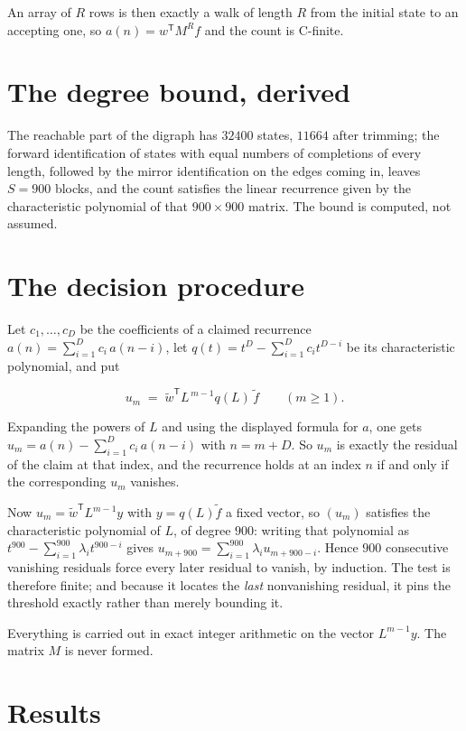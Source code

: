 \documentclass[11pt]{article}
\theoremstyle{definition}
\begin{document}
An array of $R$ rows is then exactly a walk of length $R$ from the initial state to an accepting one, so $a(n) = w^{\mathsf T}M^{R}f$ and the count is C-finite.

\section{The degree bound, derived}

The reachable part of the digraph has $32400$ states, $11664$ after trimming; the forward identification of states with equal numbers of completions of every length, followed by the mirror identification on the edges coming in, leaves $S = 900$ blocks, and the count satisfies the linear recurrence given by the characteristic polynomial of that $900\times900$ matrix. The bound is computed, not assumed.

\section{The decision procedure}

Let $c_1,\dots,c_D$ be the coefficients of a claimed recurrence $a(n) = \sum_{i=1}^{D} c_i\,a(n-i)$, let $q(t) = t^{D} - \sum_{i=1}^{D} c_i t^{D-i}$ be its characteristic polynomial, and put

\[u_m \;=\; \tilde w^{\mathsf T} L^{\,m-1} q(L)\,\tilde f \qquad (m \ge 1).\]

Expanding the powers of $L$ and using the displayed formula for $a$, one gets $u_m = a(n) - \sum_{i=1}^{D} c_i\,a(n-i)$ with $n = m + D$. So $u_m$ is exactly the residual of the claim at that index, and the recurrence holds at an index $n$ if and only if the corresponding $u_m$ vanishes.

Now $u_m = \tilde w^{\mathsf T} L^{m-1} y$ with $y = q(L)\tilde f$ a fixed vector, so $(u_m)$ satisfies the characteristic polynomial of $L$, of degree $900$: writing that polynomial as $t^{900} - \sum_{i=1}^{900} \lambda_i t^{900-i}$ gives $u_{m+900} = \sum_{i=1}^{900} \lambda_i u_{m+900-i}$. Hence $900$ consecutive vanishing residuals force every later residual to vanish, by induction. The test is therefore finite; and because it locates the {\itshape last} nonvanishing residual, it pins the threshold exactly rather than merely bounding it.

Everything is carried out in exact integer arithmetic on the vector $L^{m-1}y$. The matrix $M$ is never formed.

\section{Results}
\end{document}
